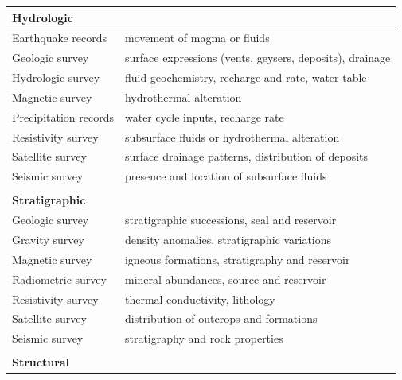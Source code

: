 \begin{table}
\begin{tabular}{ll}
\textbf{Hydrologic}     &                                                          \\ \hline
Earthquake records      & movement of magma or fluids                              \\
Geologic survey         & surface expressions (vents, geysers, deposits), drainage \\
Hydrologic survey       & fluid geochemistry, recharge and rate, water table       \\
Magnetic survey         & hydrothermal alteration                                  \\
Precipitation records   & water cycle inputs, recharge rate                        \\
Resistivity survey      & subsurface fluids or hydrothermal alteration             \\
Satellite survey        & surface drainage patterns, distribution of deposits      \\
Seismic survey          & presence and location of subsurface fluids               \\
                        &                                                          \\
\textbf{Stratigraphic}  &                                                          \\ \hline
Geologic survey         & stratigraphic successions, seal and reservoir             \\
Gravity survey          & density anomalies, stratigraphic variations              \\
Magnetic survey         & igneous formations, stratigraphy and reservoir           \\
Radiometric survey      & mineral abundances, source and reservoir                 \\
Resistivity survey      & thermal conductivity, lithology                          \\
Satellite survey        & distribution of outcrops and formations                  \\
Seismic survey          & stratigraphy and rock properties                         \\
                        &                                                          \\
\textbf{Structural}     & \textbf{}                                                \\ \hline

\end{tabular}
\end{table}
